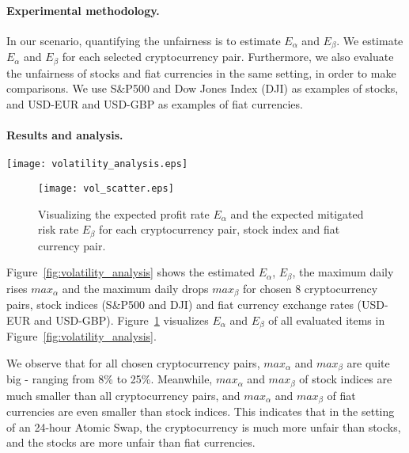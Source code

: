 \paragraph{Experimental methodology.}
In our scenario, quantifying the unfairness is to estimate $E_{\alpha}$ and $E_{\beta}$.
We estimate $E_{\alpha}$ and $E_{\beta}$ for each selected cryptocurrency pair.
Furthermore,  we also evaluate the unfairness of stocks and fiat currencies in the same setting, in order to make comparisons.
We use S\&P500 and Dow Jones Index (DJI) as examples of stocks, and USD-EUR and USD-GBP as examples of fiat currencies.

\paragraph{Results and analysis.}

\begin{figure*}
    \texttt{[image: volatility\_analysis.eps]}
    \caption{The daily percentage changes for all selected cryptocurrency pairs, stock indices and fiat currency pairs over one year (from 03/05/2018 to 03/05/2019). For each figure, $E_{\alpha}$, $E_{\beta}$, $max_\alpha$ and $max_\beta$ are the expected profit rate, the expected mitigated risk rate, the maximum daily profit and the maximum daily mitigated risk, respectively.}
    \label{fig:volatility_analysis}
\end{figure*}

\begin{figure}
    \texttt{[image: vol\_scatter.eps]}
    \caption{Visualizing the expected profit rate $E_\alpha$ and the expected mitigated risk rate $E_\beta$ for each cryptocurrency pair, stock index and fiat currency pair.}
    \label{fig:vol_scatter}
\end{figure}

Figure~\ref{fig:volatility_analysis} shows the estimated $E_\alpha$, $E_\beta$, the maximum daily rises $max_\alpha$ and the maximum  daily drops $max_\beta$ for chosen 8 cryptocurrency pairs, stock indices (S\&P500 and DJI) and fiat currency exchange rates (USD-EUR and USD-GBP).
Figure~\ref{fig:vol_scatter} visualizes $E_\alpha$ and $E_\beta$ of all evaluated items in Figure~\ref{fig:volatility_analysis}.

We observe that for all chosen cryptocurrency pairs, $max_\alpha$ and $max_\beta$ are quite big - ranging from 8\% to 25\%.
Meanwhile, $max_\alpha$ and $max_\beta$ of stock indices are much smaller than all cryptocurrency pairs,
and $max_\alpha$ and $max_\beta$ of fiat currencies are even smaller than stock indices.
This indicates that in the setting of an 24-hour Atomic Swap, the cryptocurrency is much more unfair than stocks, and the stocks are more unfair than fiat currencies.

